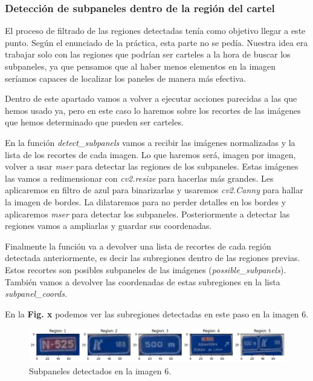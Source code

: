 \documentclass[a4paper, 12pt]{article}
\begin{document}
\subsubsection{Detección de subpaneles dentro de la región del cartel}
El proceso de filtrado de las regiones detectadas tenía como objetivo llegar a este punto. Según el enunciado de la práctica, esta parte no se pedía. Nuestra idea era trabajar solo con las regiones que podrían ser carteles a la hora de buscar los subpaneles, ya que pensamos que al haber menos elementos en la imagen seríamos capaces de localizar los paneles de manera más efectiva.

Dentro de este apartado vamos a volver a ejecutar acciones parecidas a las que hemos usado ya, pero en este caso lo haremos sobre los recortes de las imágenes que hemos determinado que pueden ser carteles. 

En la función \textit{detect\_subpanels} vamos a recibir las imágenes normalizadas y la lista de los recortes de cada imagen. Lo que haremos será, imagen por imagen, volver a usar \textit{mser} para detectar las regiones de los subpaneles. Estas imágenes las vamos a redimensionar con \textit{cv2.resize} para hacerlas más grandes. Les aplicaremos en filtro de azul para binarizarlas y usaremos \textit{cv2.Canny} para hallar la imagen de bordes. La dilataremos para no perder detalles en los bordes y aplicaremos \textit{mser} para detectar los subpaneles. Posteriormente a detectar las regiones vamos a ampliarlas y guardar sus coordenadas. 

Finalmente la función va a devolver una lista de recortes de cada región detectada anteriormente, es decir las subregiones dentro de las regiones previas. Estos recortes son posibles subpaneles de las imágenes (\textit{possible\_subpanels}). También vamos a devolver las coordenadas de estas subregiones en la lista 
\textit{subpanel\_coords}.

En la \textbf{Fig. x} podemos ver las subregiones detectadas en este paso en la imagen 6.

\begin{figure}[h]
	\centering
	\includegraphics[width=0.6\linewidth]{img/subregiones}
	\caption{Subpaneles detectados en la imagen 6.}
	\label{fig:subregioness}
\end{figure}
\end{document}
